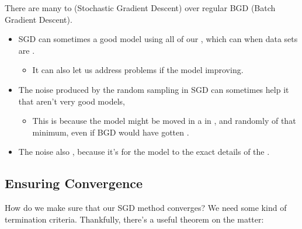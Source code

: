         \begin{concept}
            There are many  to  (Stochastic Gradient Descent) over regular BGD (Batch Gradient Descent).
            
            \begin{itemize}
                \item SGD can sometimes  a good model  using all of our , which can  when data sets are .
                    \begin{itemize}
                        \item It can also let us address problems  if the model  improving.
                    \end{itemize}
                    
                \item The noise produced by the random sampling in SGD can sometimes help it  that aren't very good models, 
                    \begin{itemize}
                        \item This is because the model might be moved in a  in , and randomly  of that minimum, even if BGD would have gotten .
                    \end{itemize}
                    
                \item The noise also , because it's  for the model to  the exact details of the .
            \end{itemize}
        \end{concept}
        
    \subsection*{Ensuring Convergence}
    
        How do we make sure that our SGD method converges? We need some kind of termination criteria. Thankfully, there's a useful theorem on the matter:\\
        
